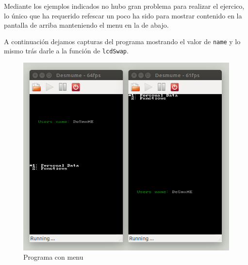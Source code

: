 \documentclass[12pt,english]{article}
\begin{document}
    Mediante los ejemplos indicados no hubo gran problema para realizar el ejercico, lo único que ha requerido refescar un poco ha sido para mostrar contenido en la pantalla de arriba manteniendo el menu en la de abajo.

    A continuación dejamos capturas del programa mostrando el valor de \texttt{name} y lo mismo trás darle a la función de \texttt{lcdSwap}.

    \begin{figure}[H] 
    \centering
    \includegraphics[scale=0.5]{images/prog}
    \caption{Programa con menu}
    \end{figure}

    
\end{document}
